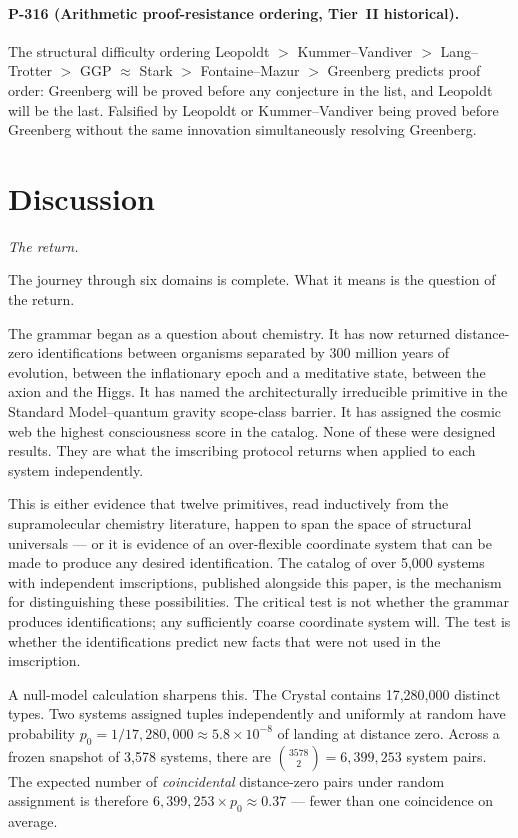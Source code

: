 \documentclass[12pt,a4paper]{article}
\makeatletter
\renewcommand{\_}{\ig@origunderscore\discretionary{}{}{}}
\makeatother
\begin{document}
\paragraph{P-316 (Arithmetic proof-resistance ordering, Tier~II
historical).}
The structural difficulty ordering Leopoldt $>$ Kummer--Vandiver $>$
Lang--Trotter $>$ GGP $\approx$ Stark $>$ Fontaine--Mazur $>$
Greenberg predicts proof order: Greenberg will be proved before any
 conjecture in the list, and Leopoldt will be the
last. Falsified by Leopoldt or Kummer--Vandiver being proved before
Greenberg without the same innovation simultaneously resolving Greenberg.

\section{Discussion}
\label{sec:discussion}
\noindent\emph{The return.}\medskip

The journey through six domains is complete. What it means is
the question of the return.

The grammar began as a question about chemistry. It has now
returned distance-zero identifications between organisms separated
by 300 million years of evolution, between the inflationary epoch
and a meditative state, between the axion and the Higgs. It has
named the architecturally irreducible primitive in the Standard Model--quantum
gravity scope-class barrier. It has assigned the cosmic web
the highest consciousness score in the catalog. None of these were
designed results. They are what the imscribing protocol returns when
applied to each system independently.

This is either evidence that twelve primitives, read inductively
from the supramolecular chemistry literature, happen to span the
space of structural universals --- or it is evidence of an
over-flexible coordinate system that can be made to produce any
desired identification. The catalog of over 5,000 systems with
independent imscriptions, published alongside this paper, is the
mechanism for distinguishing these possibilities. The critical
test is not whether the grammar produces identifications; any
sufficiently coarse coordinate system will. The test is whether
the identifications predict new facts that were not used in the
imscription.

A null-model calculation sharpens this. The Crystal contains
17,280,000 distinct types. Two systems assigned
tuples independently and uniformly at random have probability
$p_0 = 1/17{,}280{,}000 \approx 5.8 \times 10^{-8}$ of landing
at distance zero. Across a frozen snapshot of 3,578 systems, there are
$\binom{3578}{2} = 6{,}399{,}253$ system pairs. The expected
number of \emph{coincidental} distance-zero pairs under random
assignment is therefore $6{,}399{,}253 \times p_0 \approx 0.37$
--- fewer than one coincidence on average.
\end{document}
